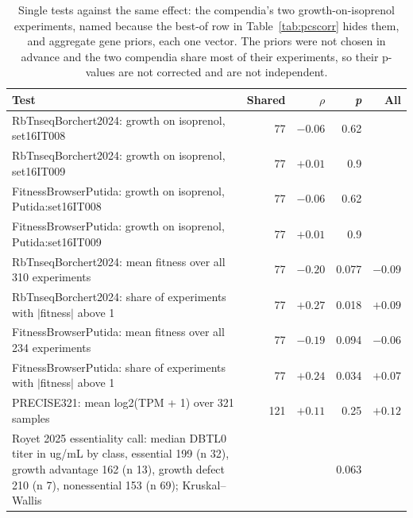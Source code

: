 \begingroup
\footnotesize
\setlength{\tabcolsep}{4pt}
\begin{longtable}{@{}L{112mm} r r r r@{}}
\caption[]{Single tests against the same effect: the compendia's two growth-on-isoprenol experiments, named because the best-of row in Table~\ref{tab:pcscorr} hides them, and aggregate gene priors, each one vector. The priors were not chosen in advance and the two compendia share most of their experiments, so their p-values are not corrected and are not independent.}\label{tab:pcspriors}\\
\toprule
Test & Shared & $\rho$ & \emph{p} & All \\
\midrule
\endfirsthead
\bottomrule
\endfoot
Rb\allowbreak Tnseq\allowbreak Borchert2024: growth on isoprenol, set16IT008 & 77 & $-0.06$ & 0.62 &  \\
Rb\allowbreak Tnseq\allowbreak Borchert2024: growth on isoprenol, set16IT009 & 77 & $+0.01$ & 0.9 &  \\
Fitness\allowbreak Browser\allowbreak Putida: growth on isoprenol, Putida:set16IT008 & 77 & $-0.06$ & 0.62 &  \\
Fitness\allowbreak Browser\allowbreak Putida: growth on isoprenol, Putida:set16IT009 & 77 & $+0.01$ & 0.9 &  \\
\addlinespace[2pt]
RbTnseqBorchert2024: mean fitness over all 310 experiments & 77 & $-0.20$ & 0.077 & $-0.09$ \\
RbTnseqBorchert2024: share of experiments with $|$fitness$|$ above 1 & 77 & $+0.27$ & 0.018 & $+0.09$ \\
FitnessBrowserPutida: mean fitness over all 234 experiments & 77 & $-0.19$ & 0.094 & $-0.06$ \\
FitnessBrowserPutida: share of experiments with $|$fitness$|$ above 1 & 77 & $+0.24$ & 0.034 & $+0.07$ \\
PRECISE321: mean log2(TPM + 1) over 321 samples & 121 & $+0.11$ & 0.25 & $+0.12$ \\
\addlinespace[2pt]
Royet 2025 essentiality call: median DBTL0 titer in ug/mL by class, essential 199 (n 32), growth advantage 162 (n 13), growth defect 210 (n 7), nonessential 153 (n 69); Kruskal--Wallis & & & 0.063 & \\
\end{longtable}
\endgroup
